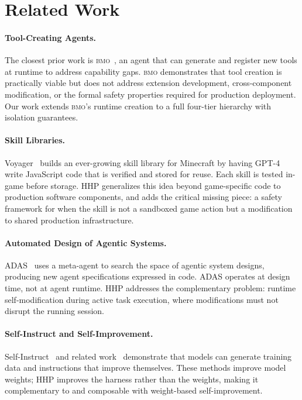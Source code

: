 \section{Related Work}

\label{sec:related}

\paragraph{Tool-Creating Agents.}
The closest prior work is \textsc{bmo}~\cite{ngrok2024bmo}, an agent that
can generate and register new tools at runtime to address capability gaps.
\textsc{bmo} demonstrates that tool creation is practically viable but does not
address extension development, cross-component modification, or the formal safety
properties required for production deployment. Our work extends \textsc{bmo}'s
runtime creation to a full four-tier hierarchy with isolation guarantees.

\paragraph{Skill Libraries.}
Voyager~\cite{wang2023voyager} builds an ever-growing skill library for
Minecraft by having GPT-4 write JavaScript code that is verified and stored for
reuse. Each skill is tested in-game before storage. HHP generalizes this idea
beyond game-specific code to production software components, and adds the
critical missing piece: a safety framework for when the skill is not a
sandboxed game action but a modification to shared production infrastructure.

\paragraph{Automated Design of Agentic Systems.}
ADAS~\cite{hu2024adas} uses a meta-agent to search the space of agentic system
designs, producing new agent specifications expressed in code. ADAS operates
at design time, not at agent runtime. HHP addresses the complementary problem:
runtime self-modification during active task execution, where modifications must
not disrupt the running session.

\paragraph{Self-Instruct and Self-Improvement.}
Self-Instruct~\cite{wang2022self} and related work~\cite{zelikman2022star,
yuan2023scaling} demonstrate that models can generate training data and
instructions that improve themselves. These methods improve model weights;
HHP improves the harness rather than the weights, making it complementary to
and composable with weight-based self-improvement.

